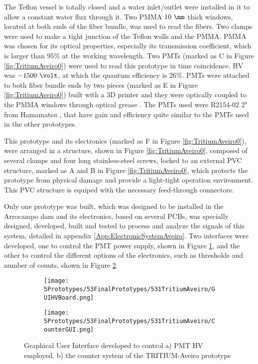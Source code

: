 The Teflon vessel is totally closed and  a water inlet/outlet were installed in it to allow a constant water flux through it. Two PMMA $10~\mm$ thick windows, located at both ends of the fiber bundle, was used to read the fibers. Two clamps were used to make a tight junction of the Teflon walls and the PMMA. PMMA was chosen for its optical properties, especially its transmission coefficient, which is larger than $95\%$ at the working wavelength. Two PMTs (marked as C in Figure \ref{fig:TritiumAveiro0}) were used to read this prototype in time coincidence. HV was $-1500~\volt$, at which the quantum efficiency is $26\%$. PMTs were attached to both fiber bundle ends by two pieces (marked as E in Figure \ref{fig:TritiumAveiro0}) built with a 3D printer and they were optically coupled to the PMMA windows through optical grease \cite{OpticalGrease}. The PMTs used were R2154-02 2" from Hamamatsu \cite{DataSheetPMTsAveiro}, that have gain and efficiency quite similar to the PMTs used in the other prototypes.

This prototype and its electronics (marked as F in Figure \ref{fig:TritiumAveiro0}), were arranged in a structure, shown in Figure \ref{fig:TritiumAveiro0}, composed of several clamps and four long stainless-steel screws, locked to an external PVC structure, marked as A and B in Figure \ref{fig:TritiumAveiro0}, which protects the prototype from physical damage and provide a light-tight operation environment. This PVC structure is equiped with the necessary feed-through connectors.

Only one prototype was built, which was designed to be installed in the Arrocampo dam and its electronics, based on several PCBs, was specially designed, developed, built and tested to process and analyze the signals of this system, detailed in appendix \ref{App:ElectronicSystemAveiro}. Two interfaces were developed, one to control the PMT power supply, shown in Figure \ref{subfig:GUIHV}, and the other to control the different options of the electronics, such as thresholds and number of counts, shown in Figure \ref{subfig:GUIcounts}.

\begin{figure}
\centering
    \begin{subfigure}[b]{0.65\textwidth}
    \centering
    \texttt{[image: 5Prototypes/53FinalPrototypes/531TritiumAveiro/GUIHVBoard.png]}  
    \caption{\label{subfig:GUIHV}}
    \end{subfigure}
    \hfill
    \begin{subfigure}[b]{0.8\textwidth}
    \centering
    \texttt{[image: 5Prototypes/53FinalPrototypes/531TritiumAveiro/CounterGUI.png]}  
    \caption{\label{subfig:GUIcounts}}
    \end{subfigure}
 \caption{Graphical User Interface developed to control a) PMT HV employed. b) the counter system of the TRITIUM-Aveiro prototype}
 \label{fig:GUITRITIUMAveiro}
\end{figure}

